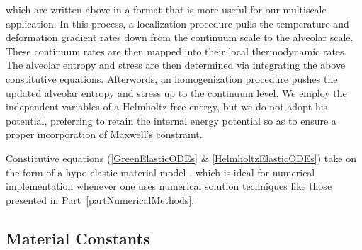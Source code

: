 which are written above in a format that is more useful for our multi\-scale application.  In this process, a localization procedure pulls the temperature and deformation gradient rates down from the continuum scale to the alveolar scale.  These continuum rates are then mapped into their local thermo\-dynamic rates.  The alveolar entropy and stress are then determined via integrating the above constitutive equations.  Afterwords, an homogenization procedure pushes the updated alveolar entropy and stress up to the continuum level.  We employ the independent variables of a Helmholtz free energy, but we do not adopt his potential, preferring to retain the internal energy potential so as to ensure a proper incorporation of Maxwell's constraint.  

Constitutive equations (\ref{GreenElasticODEs} \& \ref{HelmholtzElasticODEs}) take on the form of a hypo-elastic material model \cite{Truesdell55}, which is ideal for numerical implementation whenever one uses numerical solution techniques like those presented in Part~\ref{partNumericalMethods}.

\subsection{Material Constants}

